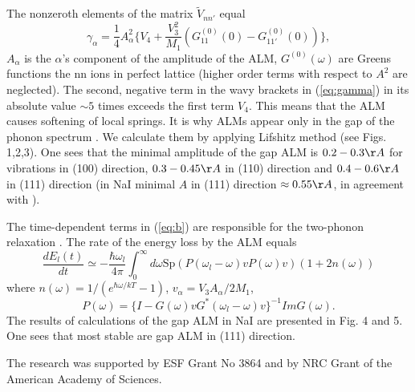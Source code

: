 \documentclass{kapproc}
\begin{document}
The nonzeroth elements of the matrix $\tilde{V}_{nn'}$ equal
\begin{equation}
\gamma_{\alpha} = \frac{1}{4}  A^2_{\alpha} {\Big \{ } V_4 +
\frac{V_3^2}{M_1} (G_{11}^{(0)}(0)-G_{11'}^{(0)}(0)) {\Big \} },
\label{eq:gamma}
\end{equation}
$A_{\alpha}$ is the $\alpha$'s component of the amplitude of the
ALM,
$G^{(0)}(\omega)$  are Greens functions the nn ions
in perfect lattice
(higher order terms with respect to $A^2$ are neglected).
The second, negative term in the wavy brackets
in (\ref{eq:gamma}) in its absolute value  $\sim 5$
times exceeds the first term $V_4$. This means that the ALM causes
softening of local springs. It is why
ALMs appear only in the gap of the phonon spectrum \cite{kisgap}.
We calculate them by applying Lifshitz method (see Figs. 1,2,3).
One sees that  the minimal amplitude of the gap ALM is $0.2 - 0.3 \AA$
for vibrations in (100)
direction,  $0.3 - 0.45 \AA$ in (110) direction and $0.4 - 0.6 \AA$
in (111) direction (in {\rm NaI}  minimal $A$ in (111) direction
$ \approx 0.55 \AA$, in agreement with \cite{kisgap}).

The time-dependent terms in (\ref{eq:b})
are responsible for the two-phonon  relaxation \cite{hizhrev}.
The rate of the energy loss by the ALM
equals
\begin{equation}
\frac{dE_l(t)}{dt} \simeq -\frac{\hbar \omega_l}{4 \pi}
 \int_0^{\infty} \!\!\!\! d \omega \mbox{Sp}
(P(\omega_l -\omega )vP(\omega)v)(1+2n(\omega ))
\end{equation}
where $n(\omega)=1/(e^{\hbar\omega/kT}-1)$, $v_{\alpha}
= V_3 A_{\alpha}/2 M_1$,
 \begin{equation}
P(\omega ) =  \lbrace I-G(\omega)vG^*(\omega_l-\omega )v\rbrace ^{-1}
ImG(\omega).
\end{equation}
The results of calculations of the gap ALM in {\rm NaI} are presented
in Fig. 4 and 5. One sees that
most stable are gap ALM in (111) direction.

The research was supported by ESF Grant No 3864 and by NRC Grant of
the American Academy of Sciences.
\end{document}
